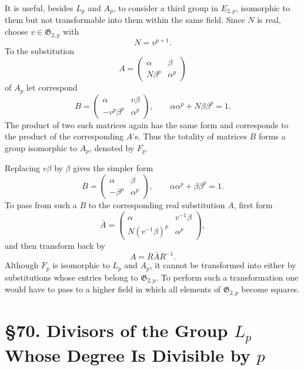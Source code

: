 \documentclass[11pt,a4paper]{book}
\newcommand{\webersection}[2]{\clearpage\section*{\S #1. #2}}
\begin{document}
It is useful, besides \(L_p\) and \(A_p\), to consider a third group in \(E_{2,p}\), isomorphic to them but not transformable into them within the same field.  Since \(N\) is real, choose \(v\in\mathfrak G_{2,p}\) with
\[
 N=v^{p+1}.
\]
To the substitution
\[
 A=\begin{pmatrix}\alpha&\beta\\N\beta^p&\alpha^p\end{pmatrix}
\]
of \(A_p\) let correspond
\begin{equation}\label{eq:69-13}
 B=\begin{pmatrix}\alpha&v\beta\\-v^p\beta^p&\alpha^p\end{pmatrix},
 \qquad \alpha\alpha^p+N\beta\beta^p=1.
\end{equation}
The product of two such matrices again has the same form and corresponds to the product of the corresponding \(A\)'s.  Thus the totality of matrices \(B\) forms a group isomorphic to \(A_p\), denoted by \(F_p\).

Replacing \(v\beta\) by \(\beta\) gives the simpler form
\begin{equation}\label{eq:69-14}
 B=\begin{pmatrix}\alpha&\beta\\-\beta^p&\alpha^p\end{pmatrix},
 \qquad \alpha\alpha^p+\beta\beta^p=1.
\end{equation}
To pass from such a \(B\) to the corresponding real substitution \(A\), first form
\begin{equation}\label{eq:69-15}
 \bar A=\begin{pmatrix}\alpha&v^{-1}\beta\\N(v^{-1}\beta)^p&\alpha^p\end{pmatrix},
\end{equation}
and then transform back by
\begin{equation}\label{eq:69-16}
 A=R\bar A R^{-1}.
\end{equation}
Although \(F_p\) is isomorphic to \(L_p\) and \(A_p\), it cannot be transformed into either by substitutions whose entries belong to \(\mathfrak G_{2,p}\).  To perform such a transformation one would have to pass to a higher field in which all elements of \(\mathfrak G_{2,p}\) become squares.

\newpage

\webersection{70}{Divisors of the Group \(L_p\) Whose Degree Is Divisible by \(p\)}
\end{document}
